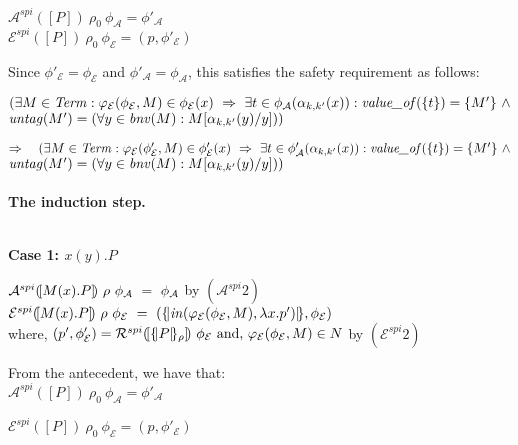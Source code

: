 \documentclass[10pt,a4paper,final,oneside,fleqn]{book}
\begin{document}
\noindent
$\mathcal{A}^{spi}(\![P]\!)~\rho_0~\phi_\mathcal{A}=\phi'_\mathcal{A}$\\
$\mathcal{E}^{spi}(\![P]\!)~\rho_0~\phi_\mathcal{E}=(p,\phi'_\mathcal{E})$\vspace{5mm}

\noindent
Since $\phi'_\mathcal{E}=\phi_\mathcal{E}$ and $\phi'_\mathcal{A}=\phi_\mathcal{A}$, this satisfies the safety requirement as follows:

\noindent
$(\exists M\in\mbox{{\itshape Term\/}}:\varphi_\mathcal{E}(\phi_\mathcal{E},M)\in\phi_\mathcal{E}(x)~\Rightarrow~\exists t\in\phi_\mathcal{A}(\alpha_{k,k'}(x)):\mbox{{\itshape value\_of\/}}(\{t\})=\{M'\}~\wedge$\\
$\mbox{{\itshape untag\/}}(M')=(\forall y\in\mbox{{\itshape bnv\/}}(M):M[\alpha_{k,k'}(y)/y]))$\vspace{5mm}

\noindent
$\Rightarrow~~~(\exists M\in\mbox{{\itshape Term\/}}:\varphi_\mathcal{E}(\phi'_\mathcal{E},M)\in\phi'_\mathcal{E}(x)~\Rightarrow~\exists t\in\phi'_\mathcal{A}(\alpha_{k,k'}(x)): \mbox{{\itshape value\_of\/}}(\{t\})=\{M'\}~\wedge$\\
$\mbox{{\itshape untag\/}}(M')=(\forall y\in\mbox{{\itshape bnv\/}}(M):M[\alpha_{k,k'}(y)/y]))$

\paragraph{The induction step.}
$ $

\noindent
{\bf Case 1: $x(y).P$}

\noindent
$\mathcal{A}^{spi}(\![M(x).P]\!)~\rho~\phi_\mathcal{A}~=~\phi_\mathcal{A}\hfill$ by $(\mathcal{A}^{spi} 2)$\\
$\mathcal{E}^{spi}(\![M(x).P]\!)~\rho~\phi_\mathcal{E}~=~(\{\!|\mbox{{\itshape in\/}}(\varphi_\mathcal{E}(\phi_\mathcal{E},M),\lambda x.p')|\!\},\phi_\mathcal{E})$\\
where, $(p',\phi'_\mathcal{E})=\mathcal{R}^{spi}(\![\{\!|P|\!\}_\rho]\!)~\phi_\mathcal{E}\mbox{ and, }\varphi_\mathcal{E}(\phi_\mathcal{E},M)\in N\hfill$ by $(\mathcal{E}^{spi} 2)$\vspace{5mm}

\noindent
From the antecedent, we have that:\\
$\mathcal{A}^{spi}(\![P]\!)~\rho_0~\phi_\mathcal{A}=\phi'_\mathcal{A}$

\noindent
$\mathcal{E}^{spi}(\![P]\!)~\rho_0~\phi_\mathcal{E}=(p,\phi'_\mathcal{E})$\vspace{5mm}
\end{document}
